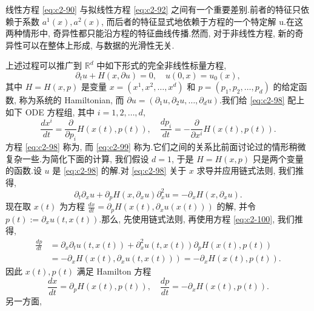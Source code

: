 \begin{remark*}
线性方程 \eqref{eq:c2-90} 与拟线性方程 \eqref{eq:c2-92} 之间有一个重要差别.前者的特征只依赖于系数 $a^{1}(x), a^{2}(x)$, 而后者的特征显式地依赖于方程的一个特定解 u.在这两种情形中, 奇异性都只能沿方程的特征曲线传播.然而, 对于非线性方程, 新的奇异性可以在整体上形成, 与数据的光滑性无关.
\end{remark*}

上述过程可以推广到 $\mathbb{R}^{d}$ 中如下形式的完全非线性标量方程,
\begin{equation}
\partial_{t} u + H(x, \partial u) = 0, \quad u(0, x) = u_{0}(x), \label{eq:c2-98}
\end{equation}
其中 $H = H(x, p)$ 是变量 $x = (x^{1}, x^{2}, \ldots, x^{d})$ 和 $p = (p_{1}, p_{2}, \ldots, p_{d})$ 的给定函数, 称为系统的 Hamiltonian, 而 $\partial u = (\partial_{1} u, \partial_{2} u, \ldots, \partial_{d} u)$.我们给 \eqref{eq:c2-98} 配上如下 ODE 方程组, 其中 $i = 1, 2, \ldots, d$,
\begin{equation}
\frac{d x^{i}}{d t} = \frac{\partial}{\partial p_{i}} H(x(t), p(t)), \quad \frac{d p_{i}}{d t} = -\frac{\partial}{\partial x^{i}} H(x(t), p(t)). \label{eq:c2-99}
\end{equation}
方程 \eqref{eq:c2-98} 称为, 而 \eqref{eq:c2-99} 称为.它们之间的关系比前面讨论过的情形稍微复杂一些.为简化下面的计算, 我们假设 $d = 1$, 于是 $H = H(x, p)$ 只是两个变量的函数.设 $u$ 是 \eqref{eq:c2-98} 的解.对 \eqref{eq:c2-98} 关于 $x$ 求导并应用链式法则, 我们推得,
\begin{equation}
\partial_{t} \partial_{x} u + \partial_{p} H(x, \partial_{x} u) \partial_{x}^{2} u = -\partial_{x} H(x, \partial_{x} u). \label{eq:c2-100}
\end{equation}
现在取 $x(t)$ 为方程 $\frac{d x}{d t} = \partial_{p} H(x(t), \partial_{x} u(x(t)))$ 的解, 并令 $p(t) := \partial_{x} u(t, x(t))$.那么, 先使用链式法则, 再使用方程 \eqref{eq:c2-100}, 我们推得,
\[
\begin{aligned}
\frac{d p}{d t} &= \partial_{x} \partial_{t} u(t, x(t)) + \partial_{x}^{2} u(t, x(t)) \partial_{p} H(x(t), p(t)) \\
&= -\partial_{x} H(x(t), \partial_{x} u(t, x(t))) = -\partial_{x} H(x(t), p(t)).
\end{aligned}
\]
因此 $x(t), p(t)$ 满足 Hamilton 方程
\[
\frac{d x}{d t} = \partial_{p} H(x(t), p(t)), \quad \frac{d p}{d t} = -\partial_{x} H(x(t), p(t)).
\]
另一方面,
